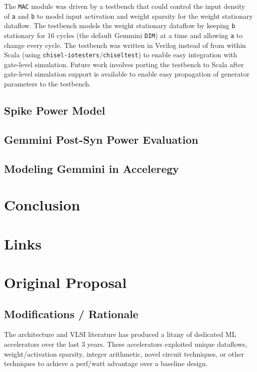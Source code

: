 \documentclass[sigconf]{acmart}
\begin{document}
The \texttt{MAC} module was driven by a testbench that could control the input density of \texttt{a} and \texttt{b} to model input activation and weight sparsity for the weight stationary dataflow.
The testbench models the weight stationary dataflow by keeping \texttt{b} stationary for 16 cycles (the default Gemmini \texttt{DIM}) at a time and allowing \texttt{a} to change every cycle.
The testbench was written in Verilog instead of from within Scala (using \texttt{chisel-iotesters}/\texttt{chiseltest}) to enable easy integration with gate-level simulation.
Future work involves porting the testbench to Scala after gate-level simulation support is available to enable easy propagation of generator parameters to the testbench.



\subsection{Spike Power Model}

\subsection{Gemmini Post-Syn Power Evaluation}

\subsection{Modeling Gemmini in Acceleregy}

\section{Conclusion}

\appendix
\section{Links}

\section{Original Proposal}

\subsection{Modifications / Rationale}


The architecture and VLSI literature has produced a litany of dedicated ML accelerators over the last 3 years.
These accelerators exploited unique dataflows, weight/activation sparsity, integer arithmetic, novel circuit techniques, or other techniques to achieve a perf/watt advantage over a baseline design.
\end{document}
